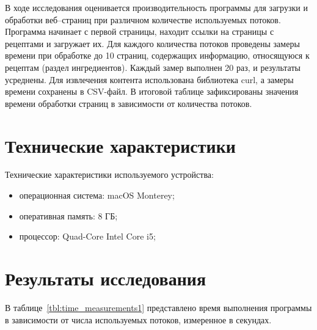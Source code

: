 



В ходе исследования оценивается производительность программы для загрузки и обработки веб--страниц при различном количестве используемых потоков. Программа начинает с первой страницы, находит ссылки на страницы с рецептами и загружает их. Для каждого количества потоков проведены замеры времени при обработке до 10 страниц, содержащих информацию, относящуюся к рецептам (раздел ингредиентов). Каждый замер выполнен 20 раз, и результаты усреднены. Для извлечения контента использована библиотека curl, а замеры времени сохранены в CSV-файл. В итоговой таблице зафиксированы значения времени обработки страниц в зависимости от количества потоков.

\section{Технические характеристики}
Технические характеристики используемого устройства:
\begin{itemize} 
    \item операционная система: macOS Monterey;
    \item оперативная память: 8 ГБ;
    \item процессор: Quad-Core Intel Core i5;
\end{itemize}

\section{Результаты исследования}
В таблице~\ref{tbl:time_measurements1} представлено время выполнения программы в зависимости от числа используемых потоков, измеренное в секундах.

